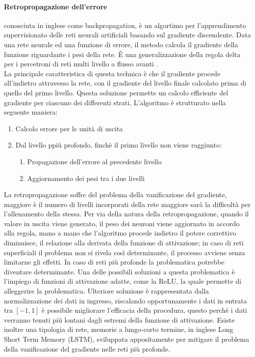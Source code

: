 \documentclass[%
    corpo=12pt,
    twoside,
    oldstyle,
    autoretitolo,
    greek,
    evenboxes,
]{toptesi}
\begin{document}
\paragraph{Retropropagazione dell'errore} conosciuta in inglese come backpropagation, è un algortimo per l'apprendimento supervisionato delle reti neurali artificiali basando sul gradiente discendente. Data una rete neurale ed una funzione di errore, il metodo calcola il gradiente della funzione riguardante i pesi della rete. È una generalizzazione della regola delta per i percetroni di reti multi livello a flusso avanti \cite{bp}.\\
La principale caratteristica di questa technica è che il gradiente procede all'indietro attraverso la rete, con il gradiente del livello finale calcolato prima di quello del primo livello. Questa soluzione permette un calcolo efficiente del gradiente per ciascuno dei differenti strati. L'algoritmo è strutturato nella seguente maniera:
\begin{enumerate}
  \item Calcolo errore per le unità di uscita
  \item Dal livello ppiù profondo, finchè il primo livello non viene raggiunto:
  \begin{enumerate}
    \item Propagazione dell'errore al precedente livello
    \item Aggiornamento dei pesi tra i due livelli
  \end{enumerate}
\end{enumerate}
La retropropagazione soffre del problema della vanificazione del gradiente, maggiore è il numero di livelli incorporati della rete maggiore sarà la difficoltà per l'allenamento della stessa. Per via della natura della retropropagazione, quando il valore in uscita viene generato, il peso dei neuroni viene aggiornato in accordo alla regola, mano a mano che l'algoritmo procede indietro il potere correttivo diminuisce, il relazione alla derivata della funzione di attivazione; in caso di reti superficiali il problema non si rivela così determinante, il processo avviene senza limitarne gli effetti. In caso di reti più profonde la problematica potrebbe diventare determinante. Una delle possibili soluzioni a questa problematica è l'impiego di funzioni di attivazione adatte, come la ReLU, la quale permette di alleggerire la problematica. Ulteriore soluzione è rappresentata dalla normalizzazione dei dati in ingresso, riscalando opportunamente i dati in entrata tra $[-1, 1]$ è possibile migliorare l'efficacia della procedura, questo perchè i dati verranno tenuti più lontani dagli estremi della funzione di attivazione. Esiste inoltre una tipologia di rete, memorie a lungo-corto termine, in inglese Long Short Term Memory (LSTM), sviluppata appositamente per mitigare il problema della vanificazione del gradiente nelle reti più profonde.
\end{document}
